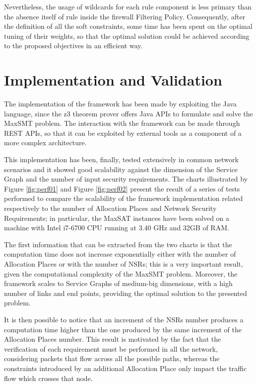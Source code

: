 \documentclass[10pt,a4paper,roman, twocolumn]{article}
\begin{document}
Nevertheless, the usage of wildcards for each rule component is less primary than the absence itself of rule inside the firewall Filtering Policy. Consequently, after the definition of all the soft constraints, some time has been spent on the optimal tuning of their weights, so that the optimal solution could be achieved according to the proposed objectives in an efficient way.

\section{Implementation and Validation}

The implementation of the framework has been made by exploiting the Java language, since the z3 theorem prover offers Java APIs to formulate and solve the MaxSMT problem. The interaction with the framework can be made through REST APIs, so that it can be exploited by external tools as a component of a more complex architecture.

This implementation has been, finally, tested extensively in common network scenarios and it showed good scalability against the dimension of the Service Graph and the number of input security requirements. The charts illustrated by Figure \ref{fig:perf01} and Figure \ref{fig:perf02} present the result of a series of tests performed to compare the scalability of the framework implementation related respectively to the number of Allocation Places and Network Security Requirements; in particular, the MaxSAT instances have been solved on a machine with Intel i7-6700 CPU running at 3.40 GHz and
32GB of RAM. 

The first information that can be extracted from the two charts is that the computation time does not increase exponentially either with the number of Allocation Places or with the number of NSRs; this is a very important result, given the computational complexity of the MaxSMT problem. Moreover, the framework scales to Service Graphs of medium-big dimensions, with a high number of links and end points, providing the optimal solution to the presented problem.

It is then possible to notice that an increment of the NSRs number produces a computation time higher than the one produced by the same increment of the Allocation Places number. This result is motivated by the fact that the verification of each requirement must be performed in all the network, considering packets that flow across all the possible paths, whereas the constraints introduced by an additional Allocation Place only impact the traffic flow which crosses that node.
\end{document}
